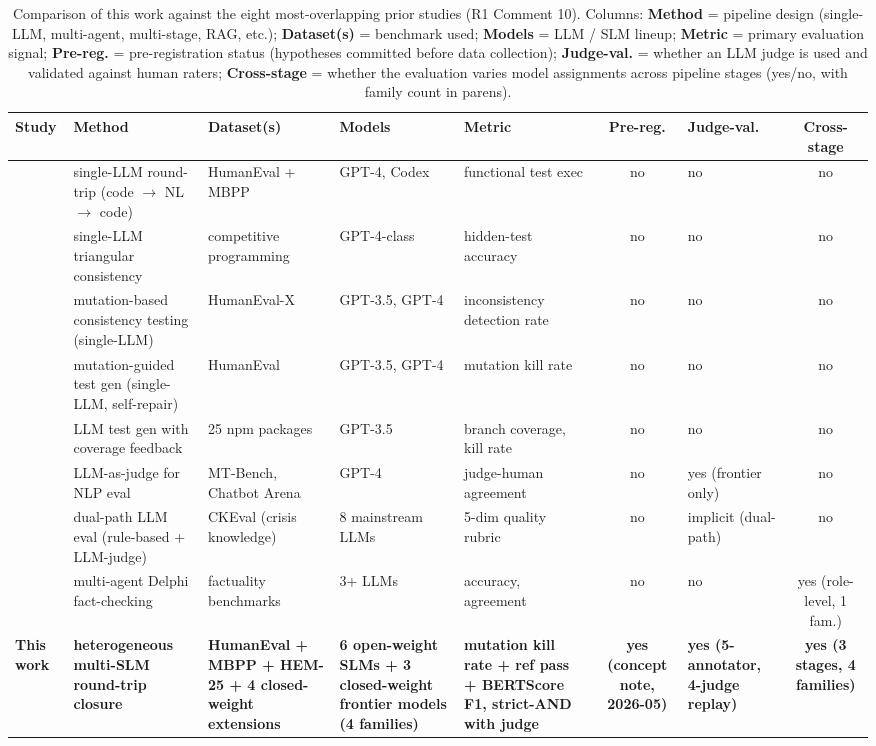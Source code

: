 \begin{table}[!htbp]
\centering
\scriptsize
\caption{Comparison of this work against the eight most-overlapping prior studies (R1 Comment 10). Columns: \textbf{Method} = pipeline design (single-LLM, multi-agent, multi-stage, RAG, etc.); \textbf{Dataset(s)} = benchmark used; \textbf{Models} = LLM / SLM lineup; \textbf{Metric} = primary evaluation signal; \textbf{Pre-reg.} = pre-registration status (hypotheses committed before data collection); \textbf{Judge-val.} = whether an LLM judge is used and validated against human raters; \textbf{Cross-stage} = whether the evaluation varies model assignments across pipeline stages (yes/no, with family count in parens).}
\label{tab:related_work_comparison}
\begin{tabular}{@{}lp{2.4cm}p{1.8cm}p{2.0cm}p{1.8cm}cp{1.6cm}c@{}}
\toprule
Study & Method & Dataset(s) & Models & Metric & Pre-reg. & Judge-val. & Cross-stage \\
\midrule
\citet{Allamanis2024RTC}        & single-LLM round-trip (code $\to$ NL $\to$ code) & HumanEval + MBPP & GPT-4, Codex & functional test exec & no  & no & no \\
\citet{Zhang2025CodingTriangle} & single-LLM triangular consistency & competitive programming & GPT-4-class & hidden-test accuracy & no  & no & no \\
\citet{Li2024MBCT}              & mutation-based consistency testing (single-LLM) & HumanEval-X & GPT-3.5, GPT-4 & inconsistency detection rate & no  & no & no \\
\citet{Dakhel2024MuTAP}         & mutation-guided test gen (single-LLM, self-repair) & HumanEval & GPT-3.5, GPT-4 & mutation kill rate & no  & no & no \\
\citet{Schafer2024TestPilot}    & LLM test gen with coverage feedback & 25 npm packages & GPT-3.5 & branch coverage, kill rate & no  & no & no \\
\citet{Zheng2023LLMJudge}       & LLM-as-judge for NLP eval & MT-Bench, Chatbot Arena & GPT-4 & judge-human agreement & no  & yes (frontier only) & no \\
\citet{Han2026CrisisKnowledge}  & dual-path LLM eval (rule-based + LLM-judge) & CKEval (crisis knowledge) & 8 mainstream LLMs & 5-dim quality rubric & no  & implicit (dual-path) & no \\
\citet{Xiong2025DelphiAgent}    & multi-agent Delphi fact-checking & factuality benchmarks & 3+ LLMs & accuracy, agreement & no  & no & yes (role-level, 1 fam.) \\
\midrule
\textbf{This work}              & \textbf{heterogeneous multi-SLM round-trip closure} & \textbf{HumanEval + MBPP + HEM-25 + 4 closed-weight extensions} & \textbf{6 open-weight SLMs + 3 closed-weight frontier models (4 families)} & \textbf{mutation kill rate + ref pass + BERTScore F1, strict-AND with judge} & \textbf{yes (concept note, 2026-05)} & \textbf{yes (5-annotator, 4-judge replay)} & \textbf{yes (3 stages, 4 families)} \\
\bottomrule
\end{tabular}
\end{table}

